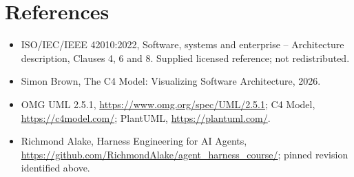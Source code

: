 \documentclass[10pt,letterpaper]{article}
\begin{document}
\section{References}
\begin{itemize}
\item ISO/IEC/IEEE 42010:2022, Software, systems and enterprise -- Architecture description, Clauses 4, 6 and 8. Supplied licensed reference; not redistributed.
\item Simon Brown, The C4 Model: Visualizing Software Architecture, 2026.
\item OMG UML 2.5.1, \url{https://www.omg.org/spec/UML/2.5.1}; C4 Model, \url{https://c4model.com/}; PlantUML, \url{https://plantuml.com/}.
\item Richmond Alake, Harness Engineering for AI Agents, \url{https://github.com/RichmondAlake/agent_harness_course/}; pinned revision identified above.
\end{itemize}
\end{document}
